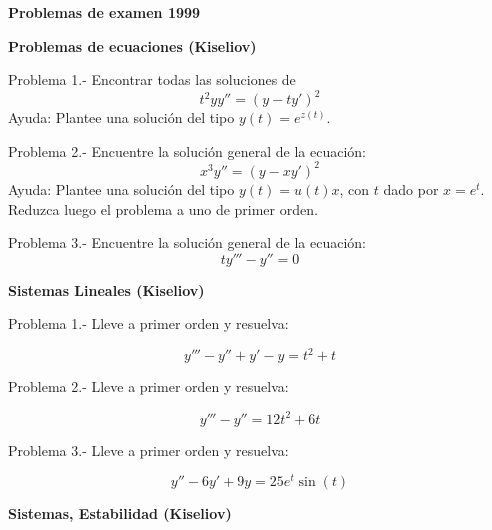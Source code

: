 \documentclass{article}
\begin{document}
\begin{center}
 \textbf{Problemas de examen  1999 }
\end{center}


\begin{center}
 \textbf{Problemas de ecuaciones (Kiseliov)}
\end{center}
\vspace{1cm}

Problema 1.- Encontrar todas las soluciones de 
\begin{equation}
t^2 y y'' = (y-ty')^2
\end{equation}
%
Ayuda: Plantee una soluci\'on del tipo $y(t) = e^{z(t)}$.

Problema 2.- Encuentre la soluci\'on general de la ecuaci\'on:
\begin{equation}
  x^3 y'' = (y-xy')^2
\end{equation}
%
Ayuda: Plantee una soluci\'on del tipo $y(t) = u(t)x$, con $t$ dado por
$x=e^t$. Reduzca luego el problema a uno de primer orden.

Problema 3.- Encuentre la soluci\'on general de la ecuaci\'on:
\begin{equation}
  t y''' - y'' = 0
\end{equation}
\vspace{1cm}

\begin{center}
 \textbf{Sistemas Lineales (Kiseliov)}
\end{center}


Problema 1.- Lleve a primer orden y resuelva:

\begin{equation}
y''' - y'' + y' -y = t^2 + t
\end{equation}


Problema 2.- Lleve a primer orden y resuelva:

\begin{equation}
y''' - y'' = 12t^2 + 6t
\end{equation}

Problema 3.- Lleve a primer orden y resuelva:

\begin{equation}
y'' - 6y' + 9y = 25e^t \sin(t)
\end{equation}

\newpage

\begin{center}
 \textbf{Sistemas, Estabilidad (Kiseliov)}
\end{center}
\vspace{1cm}
\end{document}
